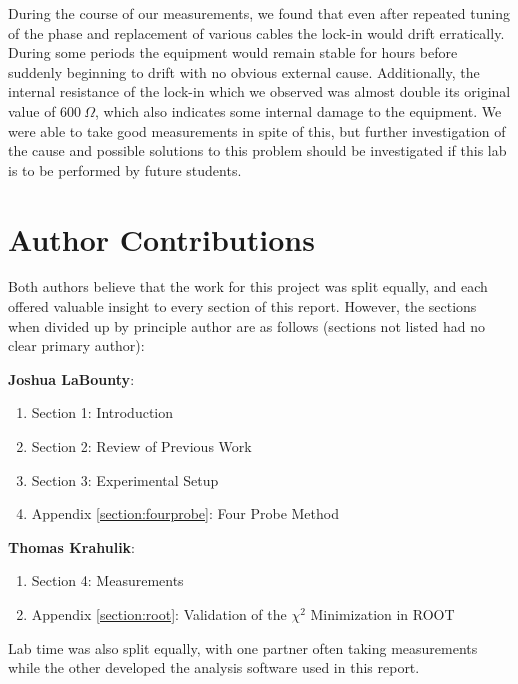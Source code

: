 \documentclass[%
 reprint,
 amsmath,amssymb,
 aps,
 pra,
]{revtex4-1}
\begin{document}
During the course of our measurements, we found that even after repeated tuning of the phase and replacement of various cables the lock-in would drift erratically. During some periods the equipment would remain stable for hours before suddenly beginning to drift with no obvious external cause. Additionally, the internal resistance of the lock-in which we observed was almost double its original value of $600~\Omega$, which also indicates some internal damage to the equipment. We were able to take good measurements in spite of this, but further investigation of the cause and possible solutions to this problem should be investigated if this lab is to be performed by future students. 

\section{Author Contributions}

Both authors believe that the work for this project was split equally, and each offered valuable insight to every section of this report. However, the sections when divided up by principle author are as follows (sections not listed had no clear primary author):

\noindent \textbf{Joshua LaBounty}:
\begin{enumerate}
	\item Section 1: Introduction
	\item Section 2: Review of Previous Work
	\item Section 3: Experimental Setup
	\item Appendix \ref{section:fourprobe}: Four Probe Method
\end{enumerate}

\noindent \textbf{Thomas Krahulik}:
\begin{enumerate}
	\item Section 4: Measurements
	\item Appendix \ref{section:root}: Validation of the $\chi^2$ Minimization in ROOT
\end{enumerate}

\noindent Lab time was also split equally, with one partner often taking measurements while the other developed the analysis software used in this report.
\end{document}
